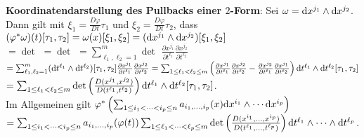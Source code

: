 \textbf{Koordinatendarstellung des Pullbacks einer $2$-Form}:
Sei $\omega = \mathrm{d} x^{j_1} \land \mathrm{d} x^{j_2}$.
Dann gilt mit $\xi_1 = \frac{D\varphi}{Dt} \tau_1$ und
$\xi_2 = \frac{D\varphi}{Dt} \tau_2$, dass
$(\varphi^\ast \omega)(t)[\tau_1, \tau_2] = \omega(x) [\xi_1, \xi_2] =
(\mathrm{d} x^{j_1} \land \mathrm{d} x^{j_2}) [\xi_1, \xi_2]$ \\
$= \det$%
$= \det$%
$= \sum_{\ell_1,\ell_2=1}^m \det$%
$\frac{\partial x^{j_1}}{\partial t^{\ell_1}}
\frac{\partial x^{j_2}}{\partial t^{\ell_2}}$ \\
$= \sum_{\ell_1,\ell_2=1}^m (\mathrm{d} t^{\ell_1} \land \mathrm{d} t^{\ell_2})[\tau_1, \tau_2]
\frac{\partial x^{j_1}}{\partial t^{\ell_1}}
\frac{\partial x^{j_2}}{\partial t^{\ell_2}}
= \sum_{1 \le \ell_1 < \ell_2 \le m} \left(
\frac{\partial x^{j_1}}{\partial t^{\ell_1}}
\frac{\partial x^{j_2}}{\partial t^{\ell_2}} -
\frac{\partial x^{j_2}}{\partial t^{\ell_1}}
\frac{\partial x^{j_1}}{\partial t^{\ell_2}}\right)
\mathrm{d} t^{\ell_1} \land \mathrm{d} t^{\ell_2} [\tau_1, \tau_2]$ \\
$= \sum_{1 \le \ell_1 < \ell_2 \le m}
\det\left(\frac{D(x^{j_1}, x^{j_2})}{D(t^{\ell_1}, t^{\ell_2})}\right)
\mathrm{d} t^{\ell_1} \land \mathrm{d} t^{\ell_2} [\tau_1, \tau_2]$. \\
Im Allgemeinen gilt
$\varphi^\ast\left(\sum_{1 \le i_1 < \dotsb < i_p \le n}
a_{i_1, \dotsc, i_p}(x) \mathrm{d} x^{i_1} \land \dotsb \mathrm{d} x^{i_p}\right)$ \\
$= \sum_{1 \le i_1 < \dotsb < i_p \le n} a_{i_1, \dotsc, i_p}(\varphi(t))
\sum_{1 \le \ell_1 < \dotsb < \ell_p \le m}
\det\left(\frac{D(x^{i_1}, \dotsc, x^{i_p})}
{D(t^{\ell_1}, \dotsc, t^{\ell_p})}\right)
\mathrm{d} t^{\ell_1} \land \dotsb \land \mathrm{d} t^{\ell_p}$.

